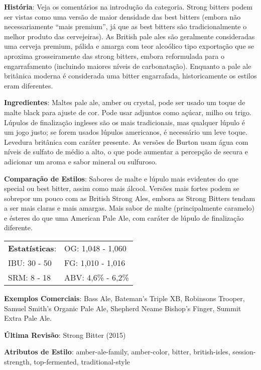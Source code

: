 \textbf{História}: Veja os comentários na introdução da categoria. Strong bitters podem ser vistas como uma versão de maior densidade das best bitters (embora não necessariamente “mais premium”, já que as best bitters são tradicionalmente o melhor produto das cervejeiras). As British pale ales são geralmente consideradas uma cerveja premium, pálida e amarga com teor alcoólico tipo exportação que se aproxima grosseiramente das strong bitters, embora reformulada para o engarrafamento (incluindo maiores níveis de carbonatação). Enquanto a pale ale britânica moderna é considerada uma bitter engarrafada, historicamente os estilos eram diferentes.

\textbf{Ingredientes}: Maltes pale ale, amber ou crystal, pode ser usado um toque de malte black para ajuste de cor. Pode usar adjuntos como açúcar, milho ou trigo. Lúpulos de finalização ingleses são os mais tradicionais, mas qualquer lúpulo é um jogo justo; se forem usados lúpulos americanos, é necessário um leve toque. Levedura britânica com caráter presente. As versões de Burton usam água com níveis de sulfato de médio a alto, o que pode aumentar a percepção de secura e adicionar um aroma e sabor mineral ou sulfuroso.

\textbf{Comparação de Estilos}: Sabores de malte e lúpulo mais evidentes do que special ou best bitter, assim como mais álcool. Versões mais fortes podem se sobrepor um pouco com as British Strong Ales, embora as Strong Bitters tendam a ser mais claras e mais amargas. Mais sabor de malte (principalmente caramelo) e ésteres do que uma American Pale Ale, com caráter de lúpulo de finalização diferente.

\begin{tabular}{@{}p{35mm}p{35mm}@{}}
  \textbf{Estatísticas}: & OG: 1,048 - 1,060 \\
  IBU: 30 - 50  & FG: 1,010 - 1,016  \\
  SRM: 8 - 18  & ABV: 4,6\% - 6,2\%
\end{tabular}

\textbf{Exemplos Comerciais}: Bass Ale, Bateman’s Triple XB, Robinsons Trooper, Samuel Smith’s Organic Pale Ale, Shepherd Neame Bishop's Finger, Summit Extra Pale Ale.

\textbf{Última Revisão}: Strong Bitter (2015)

\textbf{Atributos de Estilo}: amber-ale-family, amber-color, bitter, british-isles, session-strength, top-fermented, traditional-style
